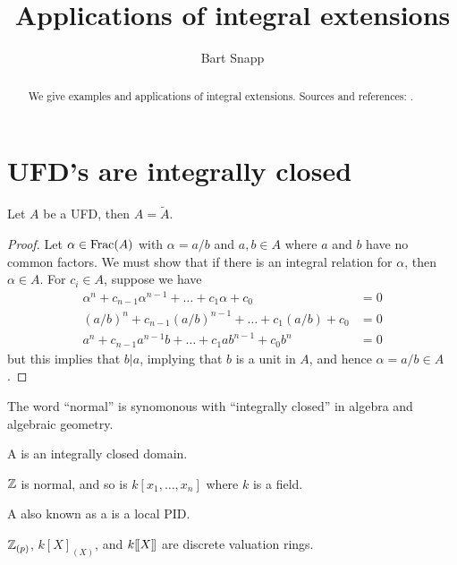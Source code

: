 \documentclass{ximera}
\author{Bart Snapp}
\title{Applications of integral extensions}
\begin{document}
\begin{abstract}
  We give examples and applications of integral extensions. Sources
  and references: \cite{GP2008,jpS2000}.
\end{abstract}
\maketitle



\section{UFD's are integrally closed}

\begin{theorem}
  Let $A$ be a UFD, then $A = \tilde{A}$.
  \begin{proof}
    Let $\alpha \in \operatorname{Frac}(A)$ with $\alpha = a/b$ and $a,b\in A$ where
    $a$ and $b$ have no common factors.  We must show that if there is
    an integral relation for $\alpha$, then $\alpha\in A$. For $c_i\in
    A$, suppose we have
    \begin{align*}
      \alpha^n + c_{n-1} \alpha^{n-1}+ \dots + c_1 \alpha + c_0 &= 0 \\
      (a/b)^n + c_{n-1} (a/b)^{n-1}+ \dots + c_1 (a/b) + c_0 &= 0 \\
      a^n + c_{n-1} a^{n-1}b+ \dots + c_1 ab^{n-1} + c_0b^n &= 0
    \end{align*}
    but this implies that $b|a$, implying that $b$ is a unit in $A$,
    and hence $\alpha = a/b\in A$.
  \end{proof}
\end{theorem}


The word ``normal'' is synomonous with ``integrally closed'' in algebra and algebraic geometry.

\begin{definition}
  A  is an integrally closed domain.
\end{definition}

\begin{corollary}
  $\mathbb Z$ is normal, and so is $k[x_1,\dots,x_n]$ where $k$ is a field.
\end{corollary}


\begin{definition}
  A  also known as a  is a local
  PID.
\end{definition}

\begin{example}
  $\mathbb Z_{(p)}$, $k[X]_{(X)}$, and $k[\hspace{-0.25ex}[ X]\hspace{-0.25ex}]$ are discrete valuation
  rings.
\end{example}
\end{document}
